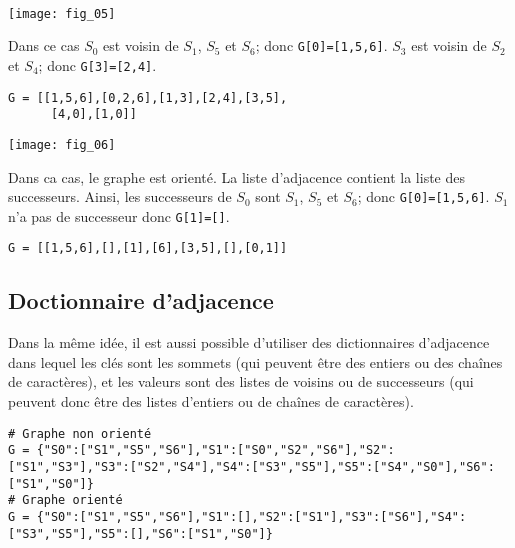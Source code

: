\begin{exemple} ~\\
\begin{minipage}[b]{.47\linewidth}
\begin{center}
\texttt{[image: fig\_05]}
\end{center}
Dans ce cas $S_0$ est voisin de $S_1$, $S_5$ et $S_6$; donc \texttt{G[0]=[1,5,6]}. 
$S_3$ est voisin de $S_2$ et $S_4$; donc \texttt{G[3]=[2,4]}.
\begin{lstlisting}
G = [[1,5,6],[0,2,6],[1,3],[2,4],[3,5],
      [4,0],[1,0]]
\end{lstlisting}
\end{minipage}\hfill
\begin{minipage}[b]{.47\linewidth}
\begin{center}
\texttt{[image: fig\_06]}
\end{center}
Dans ca cas, le graphe est orienté. La liste d'adjacence contient la liste des successeurs. Ainsi, les successeurs de $S_0$ sont $S_1$, $S_5$ et $S_6$; donc \texttt{G[0]=[1,5,6]}. $S_1$ n'a pas de successeur donc \texttt{G[1]=[]}.
\begin{lstlisting}
G = [[1,5,6],[],[1],[6],[3,5],[],[0,1]]
\end{lstlisting}
\end{minipage}
\end{exemple}


\subsection{Doctionnaire d'adjacence}

Dans la même idée, il est aussi possible d'utiliser des dictionnaires d'adjacence dans lequel les clés sont les sommets (qui peuvent être des entiers ou des chaînes de caractères), et les valeurs sont des listes de voisins ou de successeurs (qui peuvent donc être des listes d'entiers ou de chaînes de caractères).

\begin{lstlisting}
# Graphe non orienté 
G = {"S0":["S1","S5","S6"],"S1":["S0","S2","S6"],"S2":["S1","S3"],"S3":["S2","S4"],"S4":["S3","S5"],"S5":["S4","S0"],"S6":["S1","S0"]}
# Graphe orienté 
G = {"S0":["S1","S5","S6"],"S1":[],"S2":["S1"],"S3":["S6"],"S4":["S3","S5"],"S5":[],"S6":["S1","S0"]}
\end{lstlisting}

